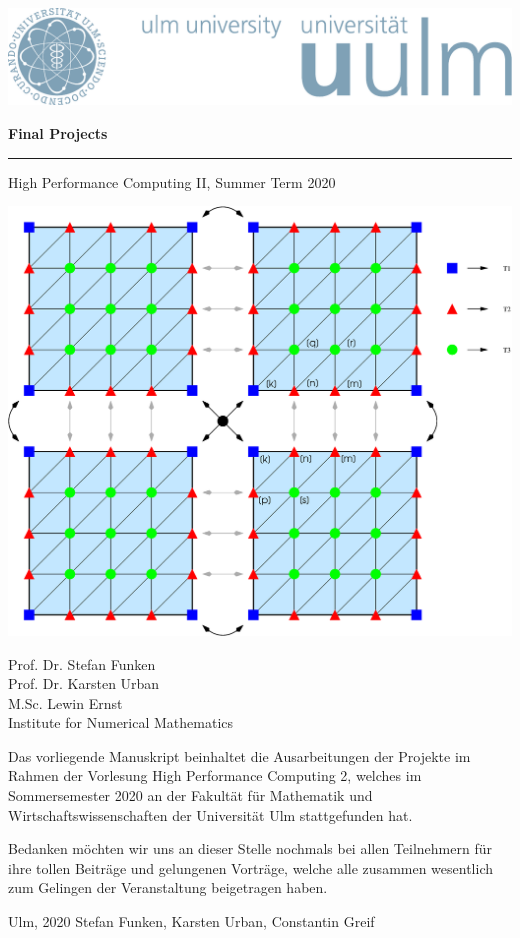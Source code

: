 \documentclass[paper=a4,11pt,oneside]{article}
\theoremstyle{definition}
\theoremstyle{definition}
\theoremstyle{definition}
\theoremstyle{definition}
\theoremstyle{definition}
\theoremstyle{definition}
\theoremstyle{definition}
\theoremstyle{remark}
\theoremstyle{definition}
\begin{document}
\thispagestyle{empty}
\begin{flushright}
  \includegraphics[width=0.5\linewidth]{Grafiken/UniLogo.pdf}
\vspace*{50pt}

  \begin{LARGE}

    \textbf{\sc Final Projects} \\
    \rule{340pt}{1.5pt}

\end{LARGE}
\begin{Large}
High Performance Computing II, Summer Term 2020
\end{Large}

\vspace*{70pt}

\begin{center}
 \includegraphics[width=0.4 \linewidth]{Grafiken/decomp.eps}
\end{center}

\vspace*{80pt}

Prof. Dr. Stefan Funken  \\
Prof. Dr. Karsten Urban\\
M.Sc. Lewin Ernst \\
  \vspace{8pt}
  Institute for Numerical Mathematics
  
\newpage
\vspace{-2cm}
Das vorliegende Manuskript beinhaltet die Ausarbeitungen der
Projekte im Rahmen der Vorlesung High Performance Computing 2, 
welches im Sommersemester 2020 an der Fakult\"at f\"ur 
Mathematik und Wirtschaftswissenschaften der Universit\"at Ulm 
stattgefunden hat.

\medskip

Bedanken m\"ochten wir uns an dieser Stelle nochmals bei allen Teilnehmern f\"ur
ihre tollen Beitr\"age und gelungenen Vortr\"age, welche alle zusammen wesentlich 
zum Gelingen der Veranstaltung beigetragen haben.

\bigskip
\bigskip

Ulm, 2020 \hfill  Stefan Funken, Karsten Urban, Constantin Greif

  
  
  
 

\end{flushright}
\thispagestyle{empty} 
\end{document}
